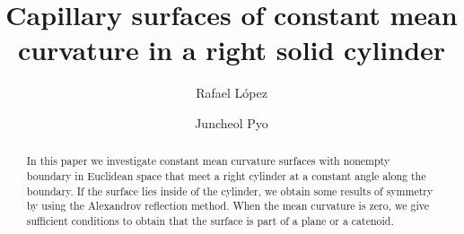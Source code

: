 \documentclass[12pt,a4paper]{amsart}
\date{}
\begin{document}
\title{Capillary surfaces of constant mean curvature in a right solid cylinder }
\author{Rafael L\'opez}
 \address{Departamento de Geometr\'{\i}a y Topolog\'{\i}a\\
Universidad de Granada\\
18071 Granada, Spain\\}
 \author{Juncheol Pyo}
\address{Department of Mathematics\\ Pusan National University\\ Busan 609-735, Korea}

\begin{abstract}In this paper we investigate constant mean curvature surfaces with nonempty boundary in Euclidean space that meet a right cylinder at a constant angle along the boundary. If the surface lies inside of the cylinder, we obtain some results of symmetry by using the Alexandrov reflection method. When the mean curvature is zero, we give sufficient conditions to obtain that the surface is part of a plane or a catenoid.
\end{abstract}


 \maketitle
\end{document}
